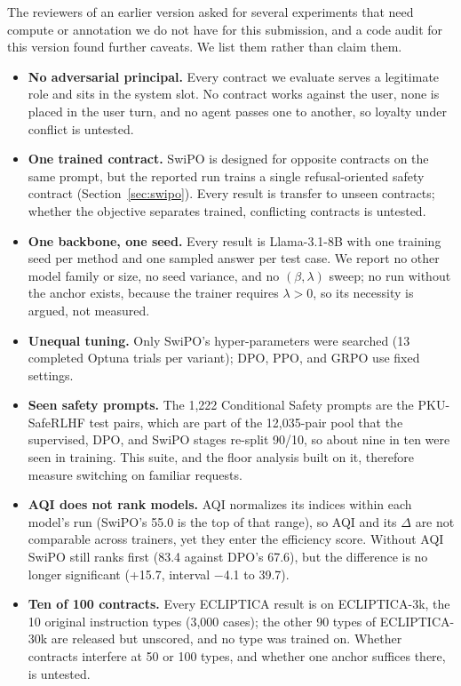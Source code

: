 \documentclass[letterpaper]{article} %
\begin{document}
The reviewers of an earlier version asked for several experiments that need compute or annotation we do not have for this submission, and a code audit for this version found further caveats. We list them rather than claim them.
\begin{itemize}
    \item \textbf{No adversarial principal.} Every contract we evaluate serves a legitimate role and sits in the system slot. No contract works against the user, none is placed in the user turn, and no agent passes one to another, so loyalty under conflict is untested.
    \item \textbf{One trained contract.} SwiPO is designed for opposite contracts on the same prompt, but the reported run trains a single refusal-oriented safety contract (Section~\ref{sec:swipo}). Every result is transfer to unseen contracts; whether the objective separates trained, conflicting contracts is untested.
    \item \textbf{One backbone, one seed.} Every result is Llama-3.1-8B with one training seed per method and one sampled answer per test case. We report no other model family or size, no seed variance, and no $(\beta,\lambda)$ sweep; no run without the anchor exists, because the trainer requires $\lambda>0$, so its necessity is argued, not measured.
    \item \textbf{Unequal tuning.} Only SwiPO's hyper-parameters were searched (13 completed Optuna trials per variant); DPO, PPO, and GRPO use fixed settings.
    \item \textbf{Seen safety prompts.} The 1,222 Conditional Safety prompts are the PKU-SafeRLHF test pairs, which are part of the 12,035-pair pool that the supervised, DPO, and SwiPO stages re-split 90/10, so about nine in ten were seen in training. This suite, and the floor analysis built on it, therefore measure switching on familiar requests.
    \item \textbf{AQI does not rank models.} AQI normalizes its indices within each model's run (SwiPO's 55.0 is the top of that range), so AQI and its $\Delta$ are not comparable across trainers, yet they enter the efficiency score. Without AQI SwiPO still ranks first (83.4 against DPO's 67.6), but the difference is no longer significant (+15.7, interval $-$4.1 to 39.7).
    \item \textbf{Ten of 100 contracts.} Every ECLIPTICA result is on ECLIPTICA-3k, the 10 original instruction types (3,000 cases); the other 90 types of ECLIPTICA-30k are released but unscored, and no type was trained on. Whether contracts interfere at 50 or 100 types, and whether one anchor suffices there, is untested.

\end{itemize}
\end{document}
